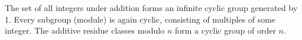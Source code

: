The set of all integers under addition forms an infinite cyclic group generated by 1. Every subgroup (module) is again cyclic, consisting of multiples of some integer. The additive residue classes modulo $n$ form a cyclic group of order $n$.

